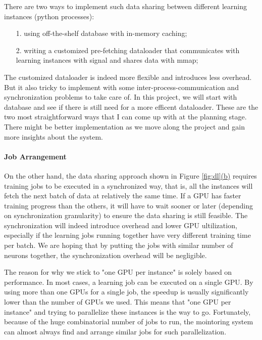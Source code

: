 \documentclass[conference]{IEEEtran}
\begin{document}
There are two ways to implement such data sharing between different learning instances (python processes): 

\begin{itemize}
	\item[1.]  using off-the-shelf database with in-memory caching;
	\item[2.]  writing a customized pre-fetching dataloader that communicates with learning instances with signal and shares data with mmap;
\end{itemize}

The customized dataloader is indeed more flexible and introduces less overhead. 
But it also tricky to implement with some inter-process-communication and synchronization problems to take care of. 
In this project, we will start with database and see if there is still need for a more efficent dataloader. 
These are the two most straightforward ways that I can come up with at the planning stage. 
There might be better implementation as we move along the project and gain more insights about the system. 

\paragraph{Job Arrangement}
On the other hand, the data sharing approach shown in Figure \ref{fig:dl}\hyperref[dl_b]{(b)} requires training jobs to be executed in a synchronized way, that is, all the instances will fetch the next batch of data at relatively the same time. 
If a GPU has faster training progress than the others, it will have to wait sooner or later (depending on synchronization granularity) to ensure the data sharing is still feasible. 
The synchronization will indeed introduce overhead and lower GPU ultilization, especially if the learning jobs running together have very different training time per batch. 
We are hoping that by putting the jobs with similar number of neurons together, the synchronization overhead will be negligible. 

The reason for why we stick to "one GPU per instance" is solely based on performance. 
In most cases, a learning job can be executed on a single GPU. 
By using more than one GPUs for a single job, the speedup is usually significantly lower than the number of GPUs we used. 
This means that "one GPU per instance" and trying to parallelize these instances is the way to go. 
Fortunately, because of the huge combinatorial number of jobs to run, the mointoring system can almost always find and arrange similar jobs for such parallelization. 
\end{document}
